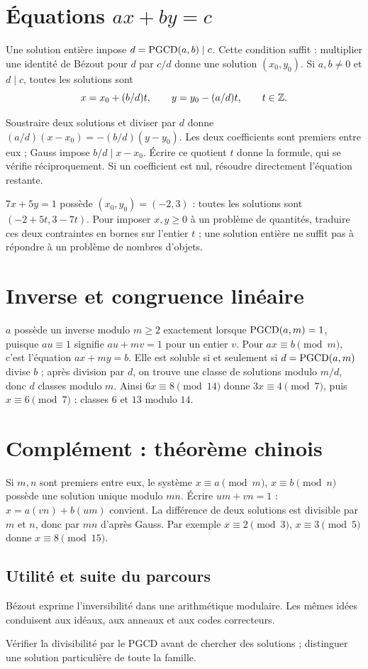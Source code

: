 \documentclass[../cours_tle.tex]{subfiles}
\begin{document}
\section{Équations $ax+by=c$}
Une solution entière impose $d=\operatorname{PGCD}(a,b)\mid c$. Cette condition suffit : multiplier une identité de Bézout pour $d$ par $c/d$ donne une solution $(x_0,y_0)$.
Si $a,b\ne0$ et $d\mid c$, toutes les solutions sont
\[
x=x_0+(b/d)t,\qquad y=y_0-(a/d)t,\qquad t\in\mathbb{Z}.
\]
\begin{demonstration}
Soustraire deux solutions et diviser par $d$ donne
$(a/d)(x-x_0)=-(b/d)(y-y_0)$.
Les deux coefficients sont premiers entre eux ; Gauss impose $b/d\mid x-x_0$. Écrire ce quotient $t$ donne la formule, qui se vérifie réciproquement.
Si un coefficient est nul, résoudre directement l'équation restante.
\end{demonstration}
\begin{exemple}
$7x+5y=1$ possède $(x_0,y_0)=(-2,3)$ : toutes les solutions sont $(-2+5t,3-7t)$.
Pour imposer $x,y\ge0$ à un problème de quantités, traduire ces deux contraintes en bornes sur l'entier $t$ ; une solution entière ne suffit pas à répondre à un problème de nombres d'objets.
\end{exemple}
\section{Inverse et congruence linéaire}
$a$ possède un inverse modulo $m\ge2$ exactement lorsque $\operatorname{PGCD}(a,m)=1$, puisque $au\equiv1$ signifie $au+mv=1$ pour un entier $v$.
Pour $ax\equiv b\pmod m$, c'est l'équation $ax+my=b$.
Elle est soluble si et seulement si $d=\operatorname{PGCD}(a,m)$ divise $b$ ; après division par $d$, on trouve une classe de solutions modulo $m/d$, donc $d$ classes modulo $m$.
Ainsi $6x\equiv8\pmod{14}$ donne $3x\equiv4\pmod7$, puis $x\equiv6\pmod7$ : classes $6$ et $13$ modulo $14$.
\section{Complément : théorème chinois}
Si $m,n$ sont premiers entre eux, le système $x\equiv a\pmod m$, $x\equiv b\pmod n$ possède une solution unique modulo $mn$.
Écrire $um+vn=1$ : $x=a(vn)+b(um)$ convient. La différence de deux solutions est divisible par $m$ et $n$, donc par $mn$ d'après Gauss.
Par exemple $x\equiv2\pmod3$, $x\equiv3\pmod5$ donne $x\equiv8\pmod{15}$.
\begin{finchapitre}
\section{Utilité et suite du parcours}
Bézout exprime l'inversibilité dans une arithmétique modulaire. Les mêmes idées conduisent aux idéaux, aux anneaux et aux codes correcteurs.
\begin{retenir}
Vérifier la divisibilité par le PGCD avant de chercher des solutions ; distinguer une solution particulière de toute la famille.
\end{retenir}
\end{finchapitre}
\end{document}

